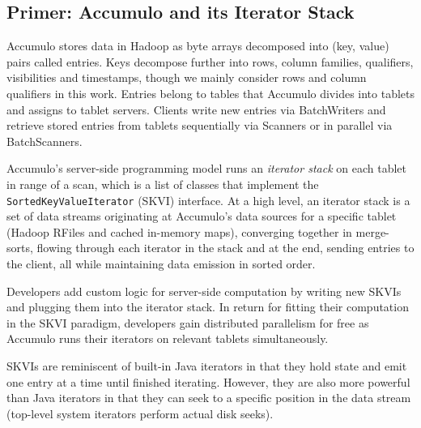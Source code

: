 





\subsection{Primer: Accumulo and its Iterator Stack}
\label{sAccumuloIterators}
Accumulo stores data in Hadoop as byte arrays decomposed into (key, value) pairs called entries.
Keys decompose further into rows, column families, qualifiers, visibilities and timestamps,
though we mainly consider rows and column qualifiers in this work.
Entries belong to tables that Accumulo divides into tablets and assigns to tablet servers.
Clients write new entries via BatchWriters and retrieve stored entries from tablets sequentially via Scanners
or in parallel via BatchScanners.

Accumulo's server-side programming model runs an \emph{iterator stack} on each tablet in range of a scan, 
which is a list of classes that implement the \texttt{SortedKeyValueIterator} (SKVI) interface.
At a high level, an iterator stack is a set of data streams originating
at Accumulo's data sources for a specific tablet (Hadoop RFiles and cached in-memory maps), 
converging together in merge-sorts,
flowing through each iterator in the stack and at the end, sending entries to the client,
all while maintaining data emission in sorted order.

Developers add custom logic for server-side computation
by writing new SKVIs and plugging them into the iterator stack.
In return for fitting their computation in the SKVI paradigm, developers gain
distributed parallelism for free as Accumulo runs their iterators on relevant tablets simultaneously.


SKVIs are reminiscent of built-in Java iterators in that they hold state 
and emit one entry at a time until finished iterating.
However, they are also more powerful than Java iterators in that they can seek to a specific position
in the data stream (top-level system iterators perform actual disk seeks).

